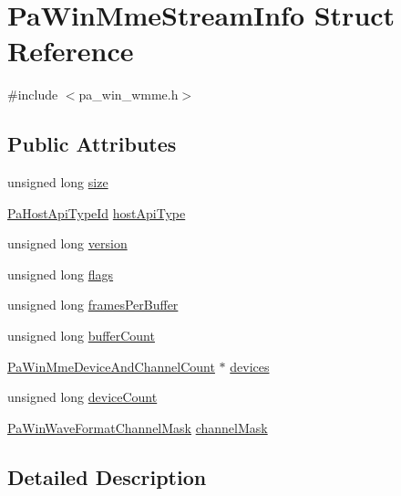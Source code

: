 \hypertarget{struct_pa_win_mme_stream_info}{}\section{Pa\+Win\+Mme\+Stream\+Info Struct Reference}
\label{struct_pa_win_mme_stream_info}


{\ttfamily \#include $<$pa\+\_\+win\+\_\+wmme.\+h$>$}

\subsection*{Public Attributes}
\begin{DoxyCompactItemize}
\item 
unsigned long \hyperlink{struct_pa_win_mme_stream_info_a62c0f8888229904962efdbec924d2527}{size}
\item 
\hyperlink{portaudio_8h_a8eaebe3d39c5ea45598da8f86dc2e5ae}{Pa\+Host\+Api\+Type\+Id} \hyperlink{struct_pa_win_mme_stream_info_a393237910fb36b3f42396a365184ce01}{host\+Api\+Type}
\item 
unsigned long \hyperlink{struct_pa_win_mme_stream_info_a881694ff44db0af4d0f3067453c3db38}{version}
\item 
unsigned long \hyperlink{struct_pa_win_mme_stream_info_a3c253061ac0a54f2298f979343af90c4}{flags}
\item 
unsigned long \hyperlink{struct_pa_win_mme_stream_info_a187a4ecd4f51bb767eccbf9e9e19781b}{frames\+Per\+Buffer}
\item 
unsigned long \hyperlink{struct_pa_win_mme_stream_info_aec154a2fcc5f3267e9007b2b46d4368c}{buffer\+Count}
\item 
\hyperlink{struct_pa_win_mme_device_and_channel_count}{Pa\+Win\+Mme\+Device\+And\+Channel\+Count} $\ast$ \hyperlink{struct_pa_win_mme_stream_info_a5418cc496f75d7f93de251fa1953aba3}{devices}
\item 
unsigned long \hyperlink{struct_pa_win_mme_stream_info_af811daf754308ad195bdd16cefcc99dd}{device\+Count}
\item 
\hyperlink{pa__win__waveformat_8h_ad7a5a909f82e3f45d4c690d09d53a3f4}{Pa\+Win\+Wave\+Format\+Channel\+Mask} \hyperlink{struct_pa_win_mme_stream_info_a8ee3a7c32e2e393826e306472a034bd1}{channel\+Mask}
\end{DoxyCompactItemize}


\subsection{Detailed Description}


